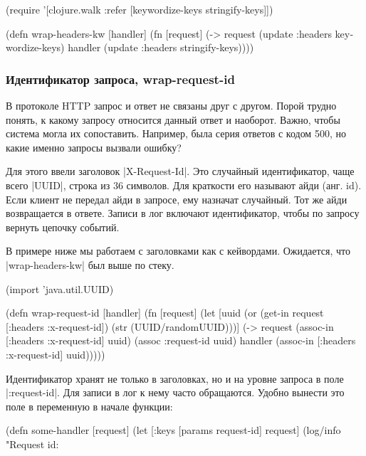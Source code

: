 \begin{english}
  \begin{clojure}
(require '[clojure.walk :refer
           [keywordize-keys stringify-keys]])

(defn wrap-headers-kw [handler]
  (fn [request]
    (-> request
        (update :headers keywordize-keys)
        handler
        (update :headers stringify-keys))))
  \end{clojure}
\end{english}

\subsubsection*{Идентификатор запроса, wrap-request-id}

В протоколе HTTP запрос и ответ не связаны друг с другом. Порой трудно понять, к
какому запросу относится данный ответ и наоборот. Важно, чтобы система
могла их сопоставить. Например, была серия ответов с кодом 500, но какие именно
запросы вызвали ошибку?

Для этого ввели заголовок \spverb|X-Request-Id|. Это случайный идентификатор,
чаще всего \spverb|UUID|, строка из 36 символов. Для краткости его называют айди
(анг. id). Если клиент не передал айди в запросе, ему назначат случайный. Тот же
айди возвращается в ответе. Записи в лог включают идентификатор, чтобы по
запросу вернуть цепочку событий.

В примере ниже мы работаем с заголовками как с кейвордами. Ожидается, что
\spverb|wrap-headers-kw| был выше по стеку.

\begin{english}
  \begin{clojure}
(import 'java.util.UUID)

(defn wrap-request-id [handler]
  (fn [request]
    (let [uuid (or (get-in request [:headers :x-request-id])
                   (str (UUID/randomUUID)))]
      (-> request
          (assoc-in [:headers :x-request-id] uuid)
          (assoc :request-id uuid)
          handler
          (assoc-in [:headers :x-request-id] uuid)))))
  \end{clojure}
\end{english}

Идентификатор хранят не только в заголовках, но и на уровне запроса в поле
\spverb|:request-id|. Для записи в лог к нему часто обращаются. Удобно вынести
это поле в переменную в начале функции:

\begin{english}
  \begin{clojure}
(defn some-handler [request]
  (let [{:keys [params request-id]} request]
    (log/info "Request id: %
  \end{clojure}
\end{english}


